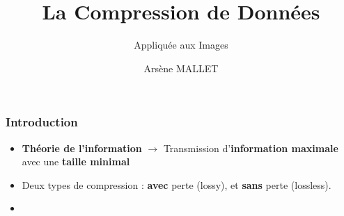 \documentclass{beamer}
\title{La Compression de Donn\'ees}
\subtitle{Appliquée aux Images}
\author{Ars\`ene MALLET}
\date{}
\institute{Numéro Candidat : 14873}
\begin{document}
\frame{\titlepage}

\begin{frame}
    \frametitle{Introduction}
    \small
    \begin{itemize}
        \item \textbf{Th\'eorie de l'information} $\rightarrow$ Transmission d'\textbf{information maximale} avec une \textbf{taille minimal}
        \item Deux types de compression : \textbf{avec} perte (lossy), et \textbf{sans} perte (lossless).
        \item 
    \end{itemize}
\end{frame}
\end{document}
